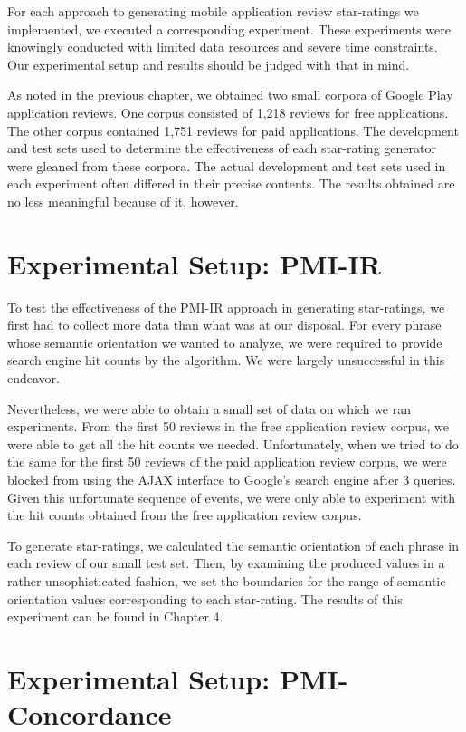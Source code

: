 \documentclass[11pt]{report} %
\begin{document}
For each approach to generating mobile application review star-ratings we implemented, we executed a corresponding experiment. These experiments were knowingly conducted with limited data resources and severe time constraints. Our experimental setup and results should be judged with that in mind. 

As noted in the previous chapter, we obtained two small corpora of Google Play application reviews. One corpus consisted of 1,218 reviews for free applications. The other corpus contained 1,751 reviews for paid applications. The development and test sets used to determine the effectiveness of each star-rating generator were gleaned from these corpora. The actual development and test sets used in each experiment often differed in their precise contents. The results obtained are no less meaningful because of it, however.

\section{Experimental Setup: PMI-IR}

To test the effectiveness of the PMI-IR approach in generating star-ratings, we first had to collect more data than what was at our disposal. For every phrase whose semantic orientation we wanted to analyze, we were required to provide search engine hit counts by the algorithm. We were largely unsuccessful in this endeavor. 

Nevertheless, we were able to obtain a small set of data on which we ran experiments. From the first 50 reviews in the free application review corpus, we were able to get all the hit counts we needed. Unfortunately, when we tried to do the same for the first 50 reviews of the paid application review corpus, we were blocked from using the AJAX interface to Google's search engine after 3 queries. Given this unfortunate sequence of events, we were only able to experiment with the hit counts obtained from the free application review corpus.

To generate star-ratings, we calculated the semantic orientation of each phrase in each review of our small test set. Then, by examining the produced values in a rather unsophisticated fashion, we set the boundaries for the range of semantic orientation values corresponding to each star-rating. The results of this experiment can be found in Chapter 4.

\section{Experimental Setup: PMI-Concordance}
\end{document}
